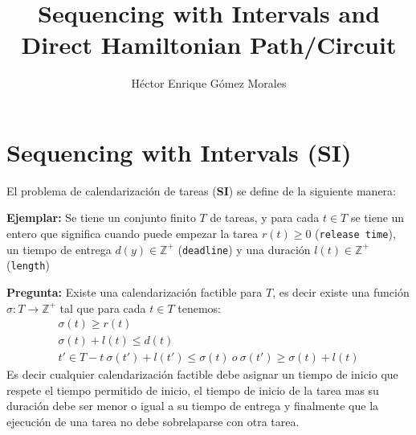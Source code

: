 \documentclass{article}
\author{Héctor Enrique Gómez Morales}
\title{Sequencing with Intervals and Direct Hamiltonian Path/Circuit}
\begin{document}
\maketitle
\section{Sequencing with Intervals (SI)}
El problema de calendarización de tareas (\textbf{SI}) se define de la siguiente manera:

\textbf{Ejemplar:} Se tiene un conjunto finito $T$ de tareas, y para cada $t \in T$
se tiene un entero que significa cuando puede empezar la tarea $r(t) \geq 0$ (\texttt{release time}), un tiempo de entrega $d(y) \in \mathbb{Z}^{+}$ (\texttt{deadline}) y una duración $l(t) \in \mathbb{Z}^{+}$ (\texttt{length})

\textbf{Pregunta:} Existe una calendarización factible para $T$, es decir existe una función $\sigma : T \rightarrow \mathbb{Z}^{+}$ tal que para cada $t \in T$ tenemos:
\begin{equation*}
  \begin{split}
    \sigma(t) \geq r(t)\\
    \sigma(t) + l(t) \leqslant d(t)\\
    t' \in T - {t}\ \sigma(t') + l(t') \leqslant \sigma(t)\ o\ \sigma(t') \geq \sigma(t) + l(t)
  \end{split}
\end{equation*}
Es decir cualquier calendarización factible debe asignar un tiempo de inicio que respete el tiempo permitido de inicio, el tiempo de inicio de la tarea mas su duración debe ser menor o igual a su tiempo de entrega y finalmente que la ejecución de una tarea no debe sobrelaparse con otra tarea.
\end{document}
